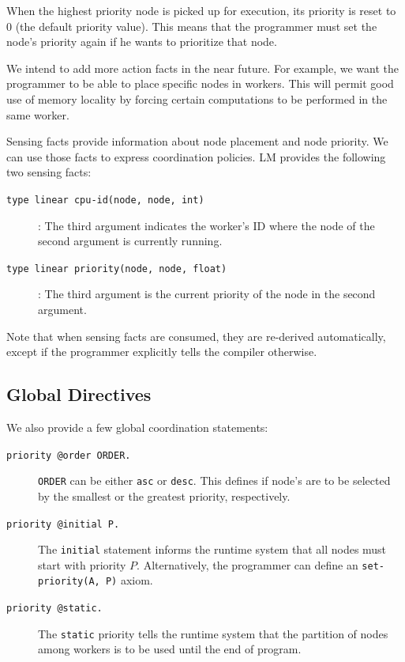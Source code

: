 When the highest priority node is picked up for execution, its priority is reset
to 0 (the default priority value). This means that the programmer must set the
node's priority again if he wants to prioritize that node.

We intend to add more action facts in the near future. For example, we want the
programmer to be able to place specific nodes in workers. This will permit good
use of memory locality by forcing certain computations to be performed in the
same worker.

Sensing facts provide information about node placement and node priority. We can
use those facts to express coordination policies. LM provides the following two
sensing facts:

\begin{description}

   \item[\texttt{type linear cpu-id(node, node, int)}]: The third argument
      indicates the worker's ID where the node of the second argument is
      currently running.

   \item[\texttt{type linear priority(node, node, float)}]: The third argument
      is the current priority of the node in the second argument.

\end{description}

Note that when sensing facts are consumed, they are re-derived automatically,
except if the programmer explicitly tells the compiler otherwise. 

\subsection{Global Directives}

We also provide a few global coordination statements:

\begin{description}

   \item[\texttt{priority @order ORDER.}] \texttt{ORDER} can be either
      \texttt{asc} or \texttt{desc}. This defines if node's are to be selected
      by the smallest or the greatest priority, respectively.

   \item[\texttt{priority @initial P.}] The \texttt{initial} statement informs
      the runtime system that all nodes must start with priority $P$.
      Alternatively, the programmer can define an \texttt{set-priority(A, P)}
      axiom.

   \item[\texttt{priority @static.}] The \texttt{static} priority tells the
      runtime system that the partition of nodes among workers is to be used
      until the end of program. 


\end{description}

